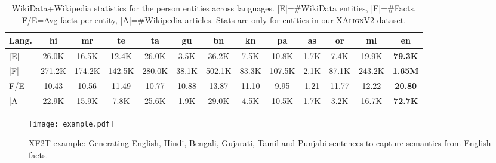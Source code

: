 \documentclass[runningheads]{llncs}
\newcommand{\data}{\textsc{XAlignV2}}
\begin{document}
\setlength{\tabcolsep}{2pt}
\begin{table}[!t]
    \centering
    \scriptsize
\begin{tabular}{|l|c|c|c|c|c|c|c|c|c|c|c|c|}
\hline
Lang.&hi&mr&te&ta&gu&bn&kn&pa&as&or&ml&\textbf{en}\\
\hline
\hline
|E|&26.0K&16.5K&12.4K&26.0K&3.5K&36.2K&7.5K&10.8K&1.7K&7.4K&19.9K&\textbf{79.3K}\\
\hline
|F|&271.2K&174.2K&142.5K&280.0K&38.1K&502.1K&83.3K&107.5K&2.1K&87.1K&243.2K&\textbf{1.65M}\\
\hline
F/E&10.43&10.56&11.49&10.77&10.88&13.87&11.10&9.95&1.21&11.77&12.22&\textbf{20.80}\\
\hline
|A|&22.9K&15.9K&7.8K&25.6K&1.9K&29.0K&4.5K&10.5K&1.7K&3.2K&16.7K&\textbf{72.7K}\\
\hline
    \end{tabular}
    \caption{WikiData+Wikipedia statistics for the person entities across languages. |E|=\#WikiData entities, |F|=\#Facts, F/E=Avg facts per entity, |A|=\#Wikipedia articles. Stats are only for entities in our \data{} dataset.}
    \label{tab:wikiDataWikipediaStats}
\end{table}
\begin{figure}
    \centering
    \texttt{[image: example.pdf]}
    \caption{XF2T example: Generating English, Hindi, Bengali, Gujarati, Tamil and Punjabi sentences to capture semantics from English facts.}
    \label{fig:example}
\end{figure}
\end{document}
